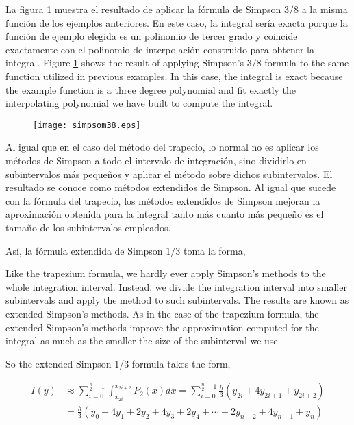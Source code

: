 \begin{paracol}{2}
La figura  \ref{fig:simpsom38} muestra el resultado de aplicar la fórmula de Simpson $3/8$ a la misma función de los ejemplos anteriores. En este caso, la integral sería exacta porque la función de ejemplo elegida es un polinomio de tercer grado y coincide exactamente con el polinomio de interpolación construido para obtener la integral.
\switchcolumn
Figure \ref{fig:simpsom38} shows the result of applying Simpson's $3/8$ formula to the same function utilized in previous examples. In this case, the integral is exact because the example function is a three degree polynomial and fit exactly the interpolating polynomial we have built to compute the integral.
\end{paracol}
\begin{figure}[h]
\centering
\texttt{[image: simpsom38.eps]}
\label{fig:simpsom38}
\end{figure}
\begin{paracol}{2}
Al igual que en el caso del método del trapecio, lo normal no es aplicar los métodos de Simpson a todo el intervalo de integración, sino dividirlo en subintervalos más pequeños y aplicar el método sobre dichos subintervalos. El resultado se conoce como métodos extendidos de Simpson. Al igual que sucede con la fórmula del trapecio, los métodos extendidos de Simpson mejoran la aproximación obtenida para la integral tanto más cuanto más pequeño es el tamaño de los subintervalos empleados. 

Así, la fórmula extendida de Simpson $1/3$ toma la forma,

\switchcolumn
Like the trapezium formula, we hardly ever apply Simpson's methods to the whole integration interval. Instead, we divide the integration interval into smaller subintervals and apply the method to such subintervals. The results are known as extended Simpson's methods. As in the case of the trapezium formula, the extended Simpson's methods improve the approximation computed for the integral as much as the smaller the size of the subinterval we use.

So the extended Simpson 1/3 formula takes the form,
\end{paracol}
\begin{align*}
	I(y)&\approx \sum_{i=0}^{\frac{n}{2}-1}\int_{x_{2i}}^{x_{2i+2}}P_2(x)dx=\sum_{i=0}^{\frac{n}{2}-1}\frac{h}{3}(y_{2i}+4y_{2i+1}+y_{2i+2})\\
&= \frac{h}{3}(y_0+4y_1+2y_2+4y_3+2y_4+\cdots + 2y_{n-2}+4y_{n-1}+y_n)
\end{align*}
